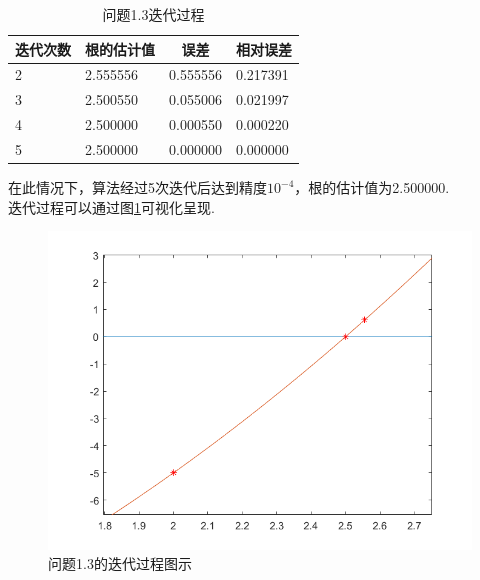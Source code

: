 \documentclass[UTF8]{ctexart}
\begin{document}
\begin{table}[]
	\centering
	\caption{问题1.3迭代过程}
	\label{t3}
	\begin{tabular}{llll}
		\hline
		\multicolumn{1}{c}{\textbf{迭代次数}} & \multicolumn{1}{c}{\textbf{根的估计值}} & \multicolumn{1}{c}{\textbf{误差}} & \multicolumn{1}{c}{\textbf{相对误差}} \\ \hline
		2                                 & 2.555556                           & 0.555556                        & 0.217391                          \\ \hline
		3                                 & 2.500550                           & 0.055006                        & 0.021997                          \\ \hline
		4                                 & 2.500000                           & 0.000550                        & 0.000220                          \\ \hline
		5                                 & 2.500000                           & 0.000000                        & 0.000000                          \\ \hline
	\end{tabular}
\end{table}
在此情况下，算法经过5次迭代后达到精度$10^{-4}$，根的估计值为2.500000.\\
迭代过程可以通过图\ref{fig:figure2}可视化呈现.
\begin{figure}[H]
	\begin{center}
		\includegraphics[width=0.7\columnwidth]{figures/problem3.png}
		\caption{问题1.3的迭代过程图示}
		\label{fig:figure2}
	\end{center}
\end{figure}
\end{document}
